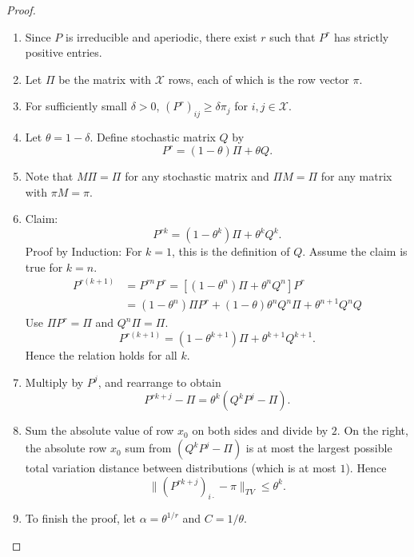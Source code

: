 \documentclass[12pt]{article}
\begin{document}
\begin{proof}
    \begin{enumerate}
        \item
            Since \( P \) is irreducible and aperiodic, there exist \( r
            \) such that \( P^r \) has strictly positive entries.
        \item
            Let \( \Pi \) be the matrix with \( \mathcal{X} \) rows,
            each of which is the row vector \( \pi \).
        \item
            For sufficiently small \( \delta > 0 \), \( (P^r)_{ij} \ge
            \delta \pi_{j} \) for \( i,j \in \mathcal{X} \).
        \item
            Let \( \theta = 1-\delta \).  Define stochastic matrix \( Q \)
            by
            \[
                P^r = (1 - \theta)\Pi + \theta Q.
            \]
        \item
            Note that \( M \Pi = \Pi \) for any stochastic matrix and \(
            \Pi M =\Pi \) for any matrix with \( \pi M = \pi \).
        \item
            Claim:
            \[
                P^{rk} = (1- \theta^{k})\Pi + \theta^k Q^k.
            \] Proof by Induction:  For \( k=1 \), this is the
            definition of \( Q \).  Assume the claim is true for \( k=n \).
            \begin{align*}
                P^{r(k+1)} &= P^{rn} P^r = [(1-\theta^n)\Pi + \theta^n Q^n]P^r
                \\
                &= (1-\theta^n)\Pi P^r + (1-\theta) \theta^n Q^n \Pi +
                \theta^{n+1} Q^n Q
            \end{align*}
            Use \( \Pi P^r = \Pi \) and \( Q^n \Pi = \Pi \).
            \[
                P^{r(k+1)} = (1- \theta^{k+1})\Pi + \theta^{k+1} Q^{k+1}.
            \] Hence the relation holds for all \( k \).
        \item
            Multiply by \( P^j \), and rearrange to obtain
            \[
                P^{rk+j} - \Pi = \theta^k (Q^k P^j - \Pi).
            \]
        \item
            Sum the absolute value of row \( x_0 \) on both sides and
            divide by \( 2 \).  On the right, the absolute row \( x_0 \)
            sum from \( (Q^k P^j - \Pi) \) is at most the largest
            possible total variation distance between distributions (which
            is at most \( 1 \)).  Hence
            \[
                \| (P^{rk+j})_{i \cdot} - \pi \|_{TV} \le \theta^k.
            \]
        \item
            To finish the proof, let \( \alpha = \theta^{1/r} \) and \(
            C= 1/\theta \).
    \end{enumerate}
\end{proof}
\end{document}
